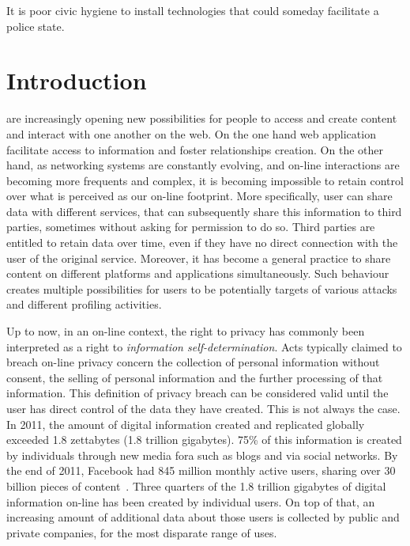 \begin{savequote}[75mm] 
It is poor civic hygiene to install technologies that could someday facilitate a police state.
\end{savequote}

\chapter{Introduction}

 are increasingly opening new possibilities for people to access and create content and interact with one another on the web. On the one hand web application facilitate access to information and foster relationships creation. On the other hand, as networking systems are constantly evolving, and on-line interactions are becoming more frequents and complex, it is becoming impossible to retain control over what is perceived as our on-line footprint. More specifically, user can share data with different services, that can subsequently share this information to third parties, sometimes without asking for permission to do so. Third parties are entitled to retain data over time, even if they have no direct connection with the user of the original service. Moreover, it has become a general practice to share content on different platforms and applications simultaneously. Such behaviour creates multiple possibilities for users to be potentially targets of various attacks and different profiling activities.

Up to now, in an on-line context, the right to privacy has commonly been interpreted as a right to \emph{information self-determination}. Acts typically claimed to breach on-line privacy concern the collection of personal information without consent, the selling of personal information and the further processing of that information. This definition of privacy breach can be considered valid until the user has direct control of the data they have created. This is not always the case. In 2011, the amount of digital information created and replicated globally exceeded 1.8 zettabytes (1.8 trillion gigabytes). 75\% of this information is created by individuals through new media fora such as blogs and via social networks. By the end of 2011, Facebook had 845 million monthly active users, sharing over 30 billion pieces of content~\cite{library-briefing}. Three quarters of the 1.8 trillion gigabytes of digital information on-line has been created by individual users. On top of that, an increasing amount of additional data about those users is collected by public and private companies, for the most disparate range of uses.

